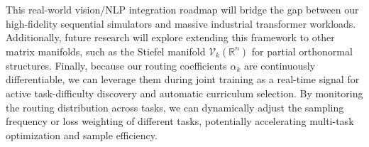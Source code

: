 This real-world vision/NLP integration roadmap will bridge the gap between our high-fidelity sequential simulators and massive industrial transformer workloads. Additionally, future research will explore extending this framework to other matrix manifolds, such as the Stiefel manifold $\mathcal{V}_k(\mathbb{R}^n)$ for partial orthonormal structures. Finally, because our routing coefficients $\alpha_k$ are continuously differentiable, we can leverage them during joint training as a real-time signal for active task-difficulty discovery and automatic curriculum selection. By monitoring the routing distribution across tasks, we can dynamically adjust the sampling frequency or loss weighting of different tasks, potentially accelerating multi-task optimization and sample efficiency.
